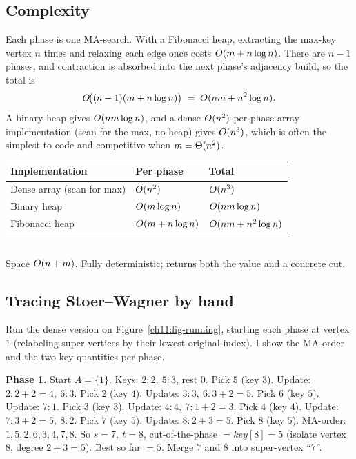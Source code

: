 \subsection{Complexity}

Each phase is one MA-search. With a Fibonacci heap, extracting the max-key vertex $n$ times and relaxing each edge once costs $O(m + n\log n)$. There are $n-1$ phases, and contraction is absorbed into the next phase's adjacency build, so the total is
\[
  O\!\big((n-1)(m + n\log n)\big) \;=\; O(nm + n^2\log n).
\]
A binary heap gives $O(nm\log n)$, and a dense $O(n^2)$-per-phase array implementation (scan for the max, no heap) gives $O(n^3)$, which is often the simplest to code and competitive when $m=\Theta(n^2)$.

\begin{complexitybox}
\begin{tabular}{lll}
\toprule
Implementation & Per phase & Total \\
\midrule
Dense array (scan for max) & $O(n^2)$ & $O(n^3)$ \\
Binary heap & $O(m\log n)$ & $O(nm\log n)$ \\
Fibonacci heap & $O(m+n\log n)$ & $O(nm+n^2\log n)$ \\
\bottomrule
\end{tabular}\\[0.4em]
Space $O(n+m)$. Fully deterministic; returns both the value and a concrete cut.
\end{complexitybox}

\subsection{Tracing Stoer--Wagner by hand}

Run the dense version on Figure~\ref{ch11:fig-running}, starting each phase at vertex $1$ (relabeling super-vertices by their lowest original index). I show the MA-order and the two key quantities per phase.

\textbf{Phase 1.} Start $A=\{1\}$. Keys: $2{:}2,\ 5{:}3$, rest $0$. Pick $5$ (key $3$). Update: $2{:}2{+}2{=}4,\ 6{:}3$. Pick $2$ (key $4$). Update: $3{:}3,\ 6{:}3{+}2{=}5$. Pick $6$ (key $5$). Update: $7{:}1$. Pick $3$ (key $3$). Update: $4{:}4,\ 7{:}1{+}2{=}3$. Pick $4$ (key $4$). Update: $7{:}3{+}2{=}5,\ 8{:}2$. Pick $7$ (key $5$). Update: $8{:}2{+}3{=}5$. Pick $8$ (key $5$).
MA-order: $1,5,2,6,3,4,7,8$. So $s=7,\ t=8$, cut-of-the-phase $=\textit{key}[8]=5$ (isolate vertex $8$, degree $2+3=5$). Best so far $=5$. Merge $7$ and $8$ into super-vertex ``7''.

